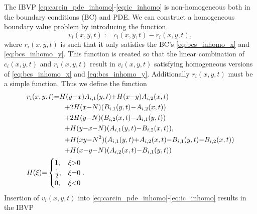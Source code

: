 \documentclass[\main/thesis.tex]{subfiles}
\begin{document}
The IBVP \eqref{eq:carcin_pde_inhomo}-\eqref{eq:ic_inhomo} is non-homogeneous 
both in the boundary conditions (BC) and PDE. We can construct a homogeneous 
boundary value problem by introducing the function
\begin{equation*}
	v_i(x, y, t) {:=} c_i(x, y, t) {-} r_i(x, y, t),
\end{equation*}
where $r_i(x, y, t)$ is such that it only satisfies the BC's 
\eqref{eq:bcs_inhomo_x} and \eqref{eq:bcs_inhomo_y}. This function is created so 
that the linear combination of $c_i(x, y, t)$ and $r_i(x, y, t)$ result in 
$v_i(x, y, t)$ satisfying homogeneous versions of \eqref{eq:bcs_inhomo_x} and 
\eqref{eq:bcs_inhomo_y}. Additionally $r_i(x, y, t)$ must be a simple function.
Thus we define the function
\begin{align}
	&r_i(x, y, t)    {=}   H(y {-} x)           A_{i,1}(y, t)
	                 {+}   H(x {-} y)           A_{i,2}(x, t)
	 \nonumber\\
	&\hspace{0.75in} {+} 2 H(x {-} N)          (B_{i,1}(y, t)
	                                        {-} A_{i,2}(x, t))
	 \nonumber\\
	&\hspace{0.75in} {+} 2 H(y {-} N)          (B_{i,2}(x, t)
	                                        {-} A_{i,1}(y, t))
	 \nonumber\\
	&\hspace{0.75in} {+}   H(y {-} x {-} N)    (A_{i,1}(y, t)
	                                        {-} B_{i,2}(x, t)),
	 \nonumber\\
	&\hspace{0.75in} {+}   H(xy {-} N^2)       (A_{i,1}(y, t) {+} A_{i,2}(x, t)
	                                        {-} B_{i,1}(y, t) {-} B_{i,2}(x, t))
	 \nonumber\\
	&\hspace{0.75in} {+}   H(x {-} y {-} N)    (A_{i,2}(x, t) {-} B_{i,1}(y, t)) 
	 \label{eq:ref_carcin_concen}\\
	&H(\xi) {=} \begin{cases}
                    1,           &\xi {>} 0 \\
                    \frac{1}
                         {2},    &\xi {=} 0 \\
                    0,           &\xi {<} 0
                \end{cases}.
	 \label{eq:heaviside}
\end{align}
Insertion of $v_i(x, y, t)$ into 
\eqref{eq:carcin_pde_inhomo}-\eqref{eq:ic_inhomo} results in the IBVP
\end{document}
